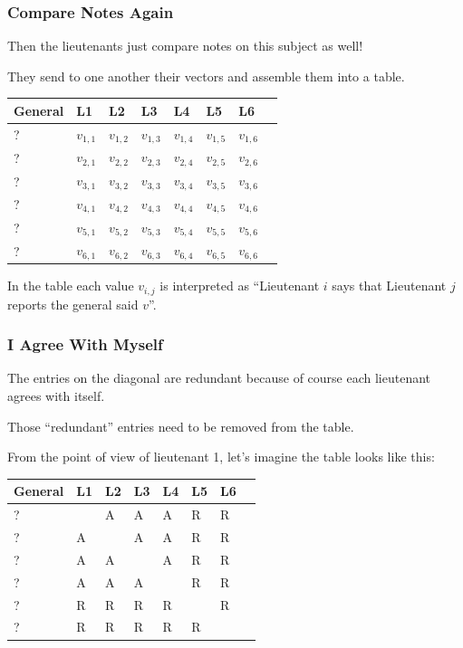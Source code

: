 \begin{frame}
	\frametitle{Compare Notes Again}

	Then the lieutenants just compare notes on this subject as well!

	They send to one another their vectors and assemble them into a table.

	\begin{center}
		\begin{tabular}{|l|l|l|l|l|l|l|l|}
			\hline
			General & L1        & L2        & L3        & L4        & L5        & L6        \\
			\hline
			?       & $v_{1,1}$ & $v_{1,2}$ & $v_{1,3}$ & $v_{1,4}$ & $v_{1,5}$ & $v_{1,6}$ \\\hline
			?       & $v_{2,1}$ & $v_{2,2}$ & $v_{2,3}$ & $v_{2,4}$ & $v_{2,5}$ & $v_{2,6}$ \\\hline
			?       & $v_{3,1}$ & $v_{3,2}$ & $v_{3,3}$ & $v_{3,4}$ & $v_{3,5}$ & $v_{3,6}$ \\\hline
			?       & $v_{4,1}$ & $v_{4,2}$ & $v_{4,3}$ & $v_{4,4}$ & $v_{4,5}$ & $v_{4,6}$ \\\hline
			?       & $v_{5,1}$ & $v_{5,2}$ & $v_{5,3}$ & $v_{5,4}$ & $v_{5,5}$ & $v_{5,6}$ \\\hline
			?       & $v_{6,1}$ & $v_{6,2}$ & $v_{6,3}$ & $v_{6,4}$ & $v_{6,5}$ & $v_{6,6}$ \\\hline
		\end{tabular}
	\end{center}

	In the table each value $v_{i,j}$ is interpreted as ``Lieutenant $i$ says that Lieutenant $j$ reports the general said $v$''.

\end{frame}


\begin{frame}
	\frametitle{I Agree With Myself}

	The entries on the diagonal are redundant because of course each lieutenant agrees with itself.

	Those ``redundant'' entries need to be removed from the table.

	From the point of view of lieutenant 1, let's imagine the table looks like this:
	\begin{center}
		\begin{tabular}{|l|l|l|l|l|l|l|l|}
			\hline
			General & L1 & L2 & L3 & L4 & L5 & L6 \\
			\hline
			?       & ~  & A  & A  & A  & R  & R  \\ \hline
			?       & A  & ~  & A  & A  & R  & R  \\ \hline
			?       & A  & A  & ~  & A  & R  & R  \\ \hline
			?       & A  & A  & A  & ~  & R  & R  \\ \hline
			?       & R  & R  & R  & R  & ~  & R  \\ \hline
			?       & R  & R  & R  & R  & R  & ~  \\ \hline
		\end{tabular}
	\end{center}

\end{frame}

